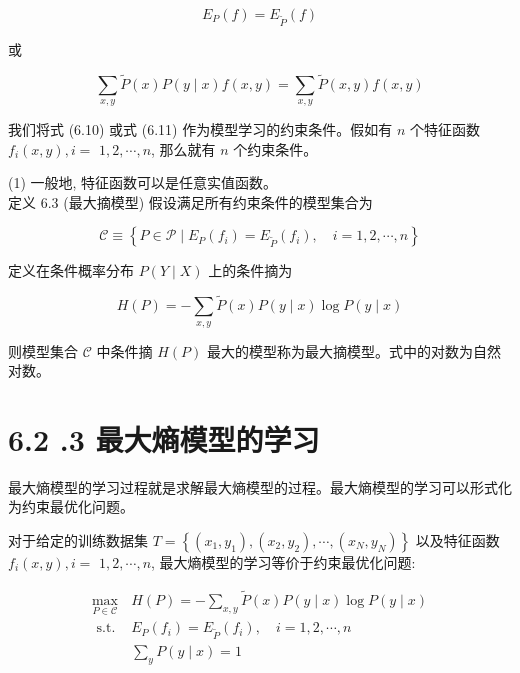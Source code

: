 \documentclass[10pt]{article}
\begin{document}
\begin{CJK*}{UTF8}{bsmi}
\begin{equation*}
E_{P}(f)=E_{\tilde{P}}(f) \tag{6.10}
\end{equation*}


或


\begin{equation*}
\sum_{x, y} \tilde{P}(x) P(y \mid x) f(x, y)=\sum_{x, y} \tilde{P}(x, y) f(x, y) \tag{6.11}
\end{equation*}


我们将式 (6.10) 或式 (6.11) 作为模型学习的约束条件。假如有 $n$ 个特征函数 $f_{i}(x, y), i=$ $1,2, \cdots, n$, 那么就有 $n$ 个约束条件。

(1) 一般地, 特征函数可以是任意实值函数。\\
定义 6.3 (最大摘模型) 假设满足所有约束条件的模型集合为


\begin{equation*}
\mathcal{C} \equiv\left\{P \in \mathcal{P} \mid E_{P}\left(f_{i}\right)=E_{\tilde{P}}\left(f_{i}\right), \quad i=1,2, \cdots, n\right\} \tag{6.12}
\end{equation*}


定义在条件概率分布 $P(Y \mid X)$ 上的条件摘为


\begin{equation*}
H(P)=-\sum_{x, y} \tilde{P}(x) P(y \mid x) \log P(y \mid x) \tag{6.13}
\end{equation*}


则模型集合 $\mathcal{C}$ 中条件摘 $H(P)$ 最大的模型称为最大摘模型。式中的对数为自然对数。

\section*{6.2 .3 最大熵模型的学习}
最大熵模型的学习过程就是求解最大熵模型的过程。最大熵模型的学习可以形式化为约束最优化问题。

对于给定的训练数据集 $T=\left\{\left(x_{1}, y_{1}\right),\left(x_{2}, y_{2}\right), \cdots,\left(x_{N}, y_{N}\right)\right\}$ 以及特征函数 $f_{i}(x, y), i=$ $1,2, \cdots, n$, 最大熵模型的学习等价于约束最优化问题:

$$
\begin{array}{ll}
\max _{P \in \mathcal{C}} & H(P)=-\sum_{x, y} \tilde{P}(x) P(y \mid x) \log P(y \mid x) \\
\text { s.t. } & E_{P}\left(f_{i}\right)=E_{\tilde{P}}\left(f_{i}\right), \quad i=1,2, \cdots, n \\
& \sum_{y} P(y \mid x)=1
\end{array}
$$


\end{CJK*}
\end{document}
